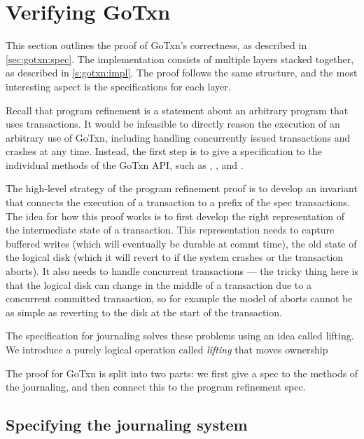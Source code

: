 \section{Verifying GoTxn}
\label{s:proof}

This section outlines the proof of GoTxn's correctness, as described in
\cref{sec:gotxn:spec}. The implementation consists of multiple layers stacked
together, as described in \cref{s:gotxn:impl}. The proof follows the same
structure, and the most interesting aspect is the specifications for each layer.

Recall that program refinement is a statement about an arbitrary program that
uses transactions. It would be infeasible to directly reason the execution of an
arbitrary use of GoTxn, including handling concurrently issued transactions and
crashes at any time. Instead, the first step is to give a specification to the
individual methods of the GoTxn API, such as , , and
.

The high-level strategy of the program refinement proof is to develop an
invariant that connects the execution of a transaction to a prefix of the spec
transactions. The idea for how this proof works is to first develop the right
representation of the intermediate state of a transaction. This representation
needs to capture buffered writes (which will eventually be durable at commt
time), the old state of the logical disk (which it will revert to if the system
crashes or the transaction aborts). It also needs to handle concurrent
transactions --- the tricky thing here is that the logical disk can change in
the middle of a transaction due to a concurrent committed transaction, so for
example the model of aborts cannot be as simple as reverting to the disk at the
start of the transaction.

The specification for journaling solves these problems using an idea called
lifting. We introduce a purely logical operation called \emph{lifting} that
moves ownership

The proof for GoTxn is split into two parts: we first give a spec to the methods
of the journaling, and then connect this to the program refinement spec.

\subsection{Specifying the journaling system}


